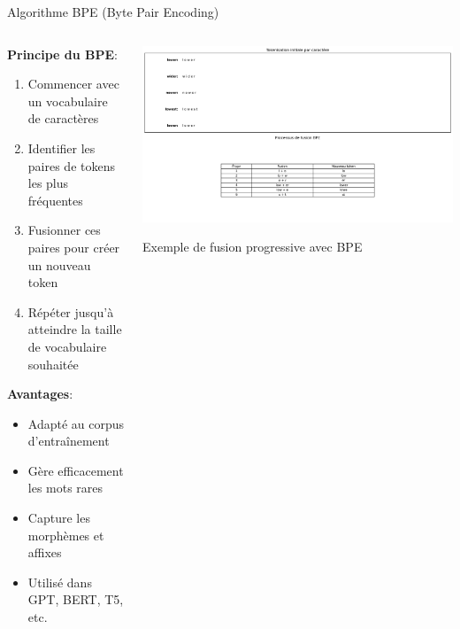 \documentclass[aspectratio=169,11pt]{beamer}
\begin{document}
\begin{frame}{Algorithme BPE (Byte Pair Encoding)}
    \begin{columns}
        \begin{column}{0.45\textwidth}
            \textbf{Principe du BPE}:
            \begin{enumerate}
                \item Commencer avec un vocabulaire de caractères
                \item Identifier les paires de tokens les plus fréquentes
                \item Fusionner ces paires pour créer un nouveau token
                \item Répéter jusqu'à atteindre la taille de vocabulaire souhaitée
            \end{enumerate}
            \vspace{0.3cm}
            \textbf{Avantages}:
            \begin{itemize}
                \item Adapté au corpus d'entraînement
                \item Gère efficacement les mots rares
                \item Capture les morphèmes et affixes
                \item Utilisé dans GPT, BERT, T5, etc.
            \end{itemize}
        \end{column}
        \begin{column}{0.55\textwidth}
            \includegraphics[width=\textwidth]{images/generated/bpe_algorithm.png}
            \vspace{0.2cm}
            \begin{center}
                \small{Exemple de fusion progressive avec BPE}
            \end{center}
        \end{column}
    \end{columns}
\end{frame}
\end{document}
